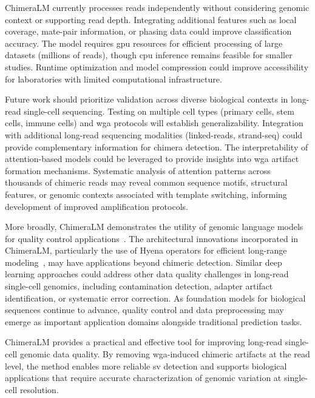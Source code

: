 \documentclass[pdflatex,sn-nature,lineno]{sn-jnl}%
\theoremstyle{thmstyleone}%
\theoremstyle{thmstyletwo}%
\theoremstyle{thmstylethree}%
\begin{document}
ChimeraLM currently processes reads independently without considering genomic context or supporting read depth. Integrating additional features such as local coverage, mate-pair information, or phasing data could improve classification accuracy. The model requires \gls{gpu} resources for efficient processing of large datasets (millions of reads), though \gls{cpu} inference remains feasible for smaller studies. Runtime optimization and model compression could improve accessibility for laboratories with limited computational infrastructure.

Future work should prioritize validation across diverse biological contexts in long-read single-cell sequencing. Testing on multiple cell types (primary cells, stem cells, immune cells) and \gls{wga} protocols will establish generalizability. Integration with additional long-read sequencing modalities (linked-reads, strand-seq) could provide complementary information for chimera detection. The interpretability of attention-based models could be leveraged to provide insights into \gls{wga} artifact formation mechanisms. Systematic analysis of attention patterns across thousands of chimeric reads may reveal common sequence motifs, structural features, or genomic contexts associated with template switching, informing development of improved amplification protocols.

More broadly, ChimeraLM demonstrates the utility of genomic language models for quality control applications~\cite{nguyen2023hyenadna}. The architectural innovations incorporated in ChimeraLM, particularly the use of Hyena operators for efficient long-range modeling~\cite{Poli2023HyenaHT}, may have applications beyond chimeric detection. Similar deep learning approaches could address other data quality challenges in long-read single-cell genomics, including contamination detection, adapter artifact identification, or systematic error correction. As foundation models for biological sequences continue to advance, quality control and data preprocessing may emerge as important application domains alongside traditional prediction tasks.

ChimeraLM provides a practical and effective tool for improving long-read single-cell genomic data quality. By removing \gls{wga}-induced chimeric artifacts at the read level, the method enables more reliable \gls{sv} detection and supports biological applications that require accurate characterization of genomic variation at single-cell resolution.
\end{document}
